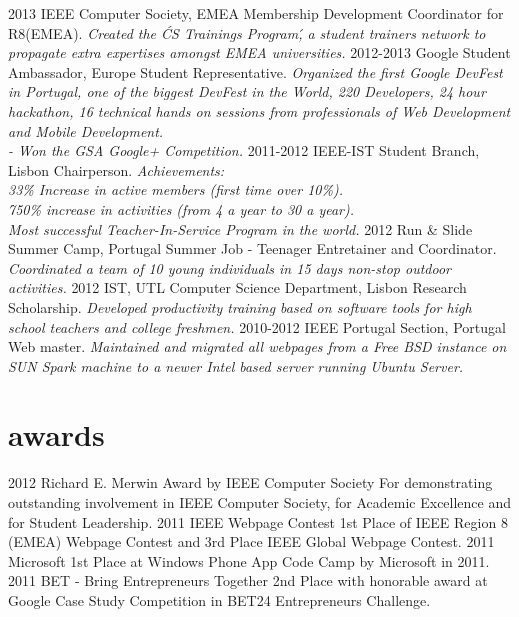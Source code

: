 \documentclass[]{friggeri-cv}
\begin{document}
\begin{entrylist} 
  \entry
    {2013}
    {IEEE Computer Society, EMEA}
    {Membership Development Coordinator for R8(EMEA).}
    {\emph{Created the \'CS Trainings Program\', a student trainers network to propagate extra expertises amongst EMEA universities.}}    
  \entry
    {2012-2013}
    {Google Student Ambassador, Europe}
    {Student Representative.}
    {\emph{Organized the first Google DevFest in Portugal, one of the biggest DevFest in the World, 220 Developers, 24 hour hackathon, 16 technical hands on sessions from professionals of Web Development and Mobile Development.\\
    - Won the GSA Google+ Competition.}}
  \entry
    {2011-2012}
    {IEEE-IST Student Branch, Lisbon}
    {Chairperson.}
    {\emph{Achievements:  \\
      33\% Increase in active members (first time over 10\%).\\
      750\% increase in activities (from 4 a year to 30 a year).\\
      Most successful Teacher-In-Service Program in the world.}}      
  \entry
     {2012}
     {Run \& Slide Summer Camp, Portugal}
     {Summer Job - Teenager Entretainer and Coordinator.}
     {\emph{Coordinated a team of 10 young individuals in 15 days non-stop outdoor activities.}}
  \entry
    {2012}
    {IST, UTL Computer Science Department, Lisbon}
    {Research Scholarship.}
    {\emph{Developed productivity training based on software tools for high school teachers and college freshmen.}}
  \entry
    {2010-2012}
    {IEEE Portugal Section, Portugal}
    {Web master.}
    {\emph{Maintained and migrated all webpages from a Free BSD instance on SUN Spark machine to a newer Intel based server running Ubuntu Server.}}

\end{entrylist}

\section{awards}

\begin{entrylist}
  \entry
    {2012}
    {Richard E. Merwin Award by IEEE Computer Society}
    {}
    {For demonstrating outstanding involvement in IEEE Computer Society, for Academic Excellence and for Student Leadership.}
  \entry
    {2011}
    {IEEE Webpage Contest}
    { }
    {1st Place of IEEE Region 8 (EMEA) Webpage Contest and 3rd Place IEEE Global Webpage Contest.}
  \entry
    {2011}
    {Microsoft}
    {}
    {1st Place at Windows Phone App Code Camp by Microsoft in 2011.}
  \entry
    {2011}
    {BET - Bring Entrepreneurs Together}
    {}
    {2nd Place with honorable award at Google Case Study Competition in BET24 Entrepreneurs Challenge.}    
\end{entrylist}

\end{document}
